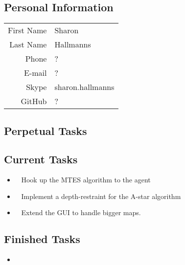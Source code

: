 \subsection{Personal Information}
\begin{table}[h!]
	\begin{tabular}{rl}
	First Name 	& Sharon\\
	Last Name	& Hallmanns\\
	Phone		& ?\\
	E-mail		& ?\\
	Skype		& sharon.hallmanns\\
	GitHub		& ?
\end{tabular}
\end{table}

\subsection{Perpetual Tasks}

\subsection{Current Tasks}
\begin{itemize}
	\item~
	Hook up the MTES algorithm to the agent
	\item~
	Implement a depth-restraint for the A-star algorithm
	\item~
	Extend the GUI to handle bigger maps.
\end{itemize}

\subsection{Finished Tasks}
\begin{itemize}
	\item
\end{itemize}